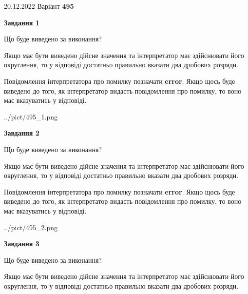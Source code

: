 \documentclass[12pt, ukrainian]{article}
\begin{document}
{20.12.2022 Варіант \No \textbf { 495 }\par}
{
\begin {Large}

{\begin {center}\textbf{Завдання 1}\end {center}}\par
Що буде виведено за виконання? \par

Якщо має бути виведено дійсне значення та інтерпретатор має здійснювати його округлення, 
то у відповіді достатньо правильно вказати два дробових розряди.

Повідомлення інтерпретатора про помилку позначати \textbf{error}.
Якщо щось буде виведено до того, як інтерпретатор видасть повідомлення про помилку, 
то воно має вказуватись у відповіді. \par

\begin{center}
	{../pict/495_1.png}
\end{center}
\newpage

{\begin {center}\textbf{Завдання 2}\end {center}}\par
Що буде виведено за виконання? \par

Якщо має бути виведено дійсне значення та інтерпретатор має здійснювати його округлення, 
то у відповіді достатньо правильно вказати два дробових розряди.

Повідомлення інтерпретатора про помилку позначати \textbf{error}.
Якщо щось буде виведено до того, як інтерпретатор видасть повідомлення про помилку, 
то воно має вказуватись у відповіді. \par

\begin{center}
	{../pict/495_2.png}
\end{center}
\newpage

{\begin {center}\textbf{Завдання 3}\end {center}}\par
Що буде виведено за виконання? \par

Якщо має бути виведено дійсне значення та інтерпретатор має здійснювати його округлення, 
то у відповіді достатньо правильно вказати два дробових розряди.


\end{Large}}
\end{document}
